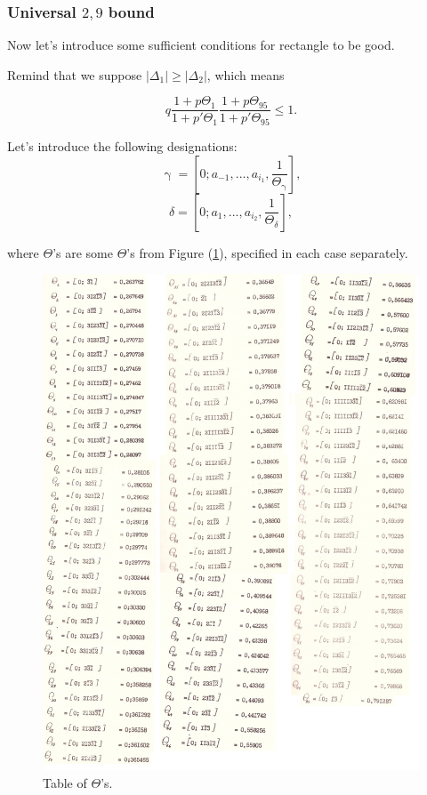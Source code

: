 \documentclass[a4paper, 12pt]{article}
\let\oldref\ref
\renewcommand{\ref}[1]{(\oldref{#1})}
\theoremstyle{definition}
\theoremstyle{definition}
\theoremstyle{proposition}
\theoremstyle{lemma}
\newcommand{\g}{\upgamma}
\renewcommand{\d}{\delta}
\newcommand{\D}{\Delta}
\newcommand{\T}{\Theta}
\begin{document}
\subsubsection{Universal $2,9$ bound}

Now let's introduce some sufficient conditions for rectangle to be good.


Remind that we suppose $|\D_1| \geqslant |\D_2|$, which means

\begin{equation*}
	q
	\dfrac{1 + p \T_{1}}{1 + p' \T_{1}}
	\dfrac{1 + p \T_{95}}{1 + p' \T_{95}} \leqslant 1.
\end{equation*}

Let's introduce the following designations:
\begin{equation*}
	\g = [0; a_{-1}, ..., a_{i_1}, \frac{1}{\T_\g}],
\end{equation*}
\begin{equation*}
	\d = [0; a_{1}, ..., a_{i_2}, \frac{1}{\T_\d}],
\end{equation*}

where $\T$'s are some $\T$'s from Figure \ref{table_theta},
specified in each case separately.

\begin{figure}[p]
	\includegraphics[width=\textwidth]{table_theta}
	\caption{Table of $\T$'s.}
	\label{table_theta}
\end{figure}
\end{document}
